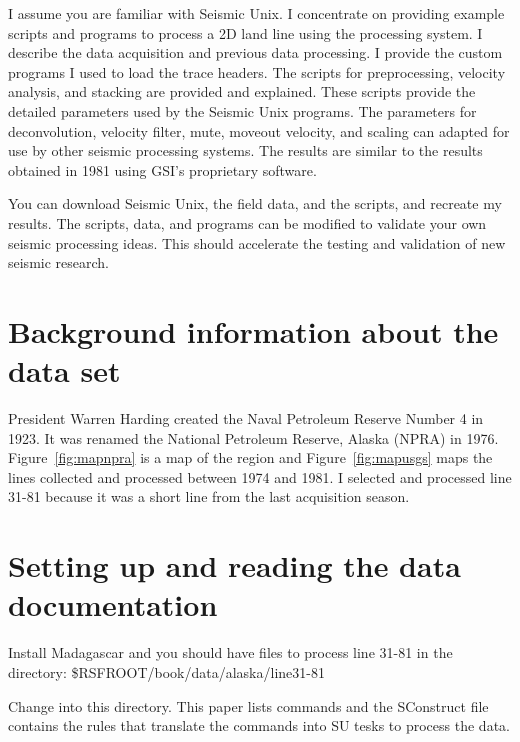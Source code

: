 I assume you are familiar with Seismic Unix.  I concentrate
on providing example scripts and programs to process a 2D land line
using the processing system. I describe the data acquisition and
previous data processing.  I provide the custom programs I used to
load the trace headers.  The scripts for preprocessing, velocity
analysis, and stacking are provided and explained.  These scripts
provide the detailed parameters used by the Seismic Unix programs.
The parameters for deconvolution, velocity filter, mute, moveout
velocity, and scaling can adapted for use by other seismic processing
systems. The results are similar to the results obtained in 1981 using
GSI's proprietary software.  

You can download Seismic Unix, the field data, and the scripts, and 
recreate my results.  The scripts, data, and programs can be modified 
to validate your own seismic processing ideas.  This should accelerate 
the testing and validation of new seismic research.

\section{Background information about the data set}

President Warren Harding created the Naval Petroleum Reserve Number 4
in 1923.  It was renamed the National Petroleum Reserve, Alaska (NPRA)
in 1976.  Figure~\ref{fig:mapnpra} is a map of the region and 
Figure~\ref{fig:mapusgs} maps the lines collected and processed between 1974
and 1981.  I selected and processed line 31-81 because it was a short
line from the last acquisition season.

\section{Setting up and reading the data documentation}
Install Madagascar and you should have files to process line 31-81 in 
the directory:
\$RSFROOT/book/data/alaska/line31-81

Change into this directory.  This paper lists commands and the SConstruct 
file contains the rules that translate the commands into SU tesks 
to process the data.

